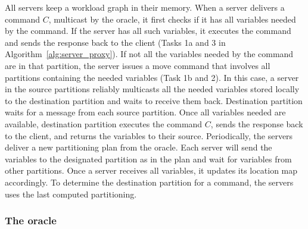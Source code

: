 All servers keep a workload graph in their memory. When a server delivers a command $C$, multicast by the oracle, it first checks if it has all variables needed by the command. If the server has all such variables, it executes the command and sends the response back to the client (Tasks 1a and 3 in Algorithm~\ref{alg:server_proxy}).
If not all the variables needed by the command are in that partition, the server issues a move command that involves all partitions containing the needed variables (Task 1b and 2).
In this case, a server in the source partitions reliably multicasts all the needed variables stored locally to the destination partition and waits to receive them back.
Destination partition waits for a message from each source partition. Once all variables needed are available, destination partition executes the command $C$, sends the response back to the client, and returns the variables to their source.
Periodically, the servers deliver a new partitioning plan from the oracle. Each server will send the variables to the designated partition as in the plan and wait for variables from other partitions. Once a server receives all variables, it updates its location map accordingly.
To determine the destination partition for a command, the servers uses the last computed partitioning.

\subsubsection{The oracle} 

